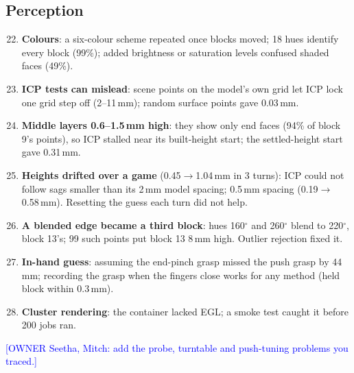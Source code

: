 \documentclass[conference]{IEEEtran}
\newcommand{\owner}[2]{\textcolor{blue}{[OWNER #1: #2]}}
\begin{document}
\subsection*{Perception}
\begin{enumerate}\setcounter{enumi}{21}
\item \textbf{Colours}: a six-colour scheme repeated once blocks moved; 18 hues identify every block (99\%); added
brightness or saturation levels confused shaded faces (49\%).
\item \textbf{ICP tests can mislead}: scene points on the model's own grid let ICP lock one grid step off (2--11\,mm);
random surface points gave 0.03\,mm.
\item \textbf{Middle layers 0.6--1.5\,mm high}: they show only end faces (94\% of block 9's points), so ICP stalled near
its built-height start; the settled-height start gave 0.31\,mm.
\item \textbf{Heights drifted over a game} (0.45$\to$1.04\,mm in 3 turns): ICP could not follow sags smaller than its
2\,mm model spacing; 0.5\,mm spacing (0.19$\to$0.58\,mm). Resetting the guess each turn did not help.
\item \textbf{A blended edge became a third block}: hues 160$^\circ$ and 260$^\circ$ blend to 220$^\circ$, block 13's; 99
such points put block 13 8\,mm high. Outlier rejection fixed it.
\item \textbf{In-hand guess}: assuming the end-pinch grasp missed the push grasp by 44\,mm; recording the grasp when the
fingers close works for any method (held block within 0.3\,mm).
\item \textbf{Cluster rendering}: the container lacked EGL; a smoke test caught it before 200 jobs ran.
\end{enumerate}
\owner{Seetha, Mitch}{add the probe, turntable and push-tuning problems you traced.}
\end{document}
